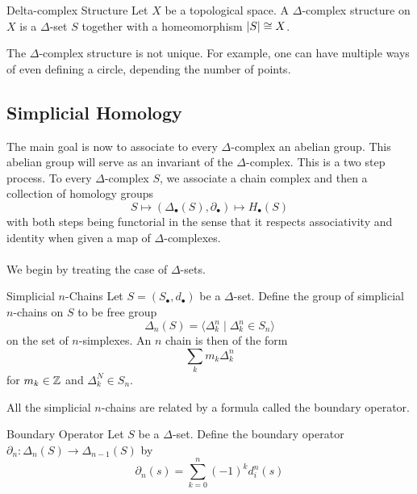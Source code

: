 \documentclass[a4paper]{article}
\begin{document}
\begin{defn}{Delta-complex Structure}{} Let $X$ be a topological space. A $\Delta$-complex structure on $X$ is a $\Delta$-set $S$ together with a homeomorphism $\abs{S}\cong X$. 
\end{defn}

The $\Delta$-complex structure is not unique. For example, one can have multiple ways of even defining a circle, depending the number of points. 

\subsection{Simplicial Homology}
The main goal is now to associate to every $\Delta$-complex an abelian group. This abelian group will serve as an invariant of the $\Delta$-complex. This is a two step process. To every $\Delta$-complex $S$, we associate a chain complex and then a collection of homology groups $$S\mapsto(\Delta_\bullet(S),\partial_\bullet)\mapsto H_\bullet(S)$$ with both steps being functorial in the sense that it respects associativity and identity when given a map of $\Delta$-complexes. \\~\\

We begin by treating the case of $\Delta$-sets. 

\begin{defn}{Simplicial $n$-Chains}{} Let $S=(S_\bullet,d_\bullet)$ be a $\Delta$-set. Define the group of simplicial $n$-chains on $S$ to be free group $$\Delta_n(S)=\langle\Delta_k^n\;|\;\Delta_k^n\in S_n\rangle$$ on the set of $n$-simplexes. An $n$ chain is then of the form $$\sum_km_k\Delta_k^n$$ for $m_k\in\mathbb{Z}$ and $\Delta_k^N\in S_n$. 
\end{defn}

All the simplicial $n$-chains are related by a formula called the boundary operator. 

\begin{defn}{Boundary Operator}{} Let $S$ be a $\Delta$-set. Define the boundary operator $\partial_n:\Delta_n(S)\to\Delta_{n-1}(S)$ by $$\partial_n(s)=\sum_{k=0}^n(-1)^kd_i^n(s)$$
\end{defn}
\end{document}
